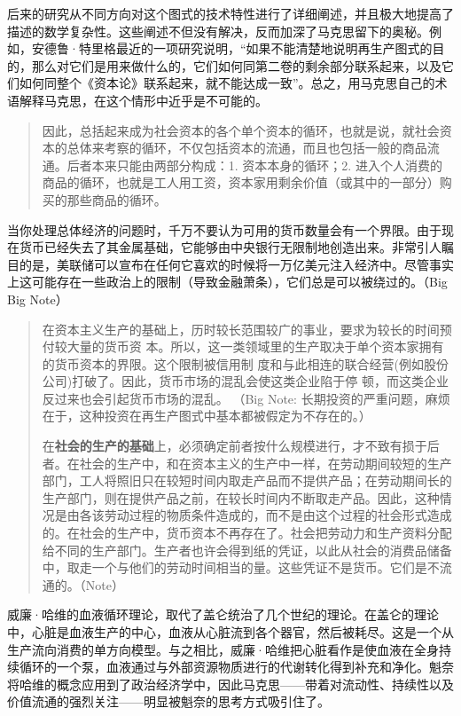 后来的研究从不同方向对这个图式的技术特性进行了详细阐述，并且极大地提高了描述的数学复杂性。这些阐述不但没有解决，反而加深了马克思留下的奥秘。例如，安德鲁·特里格最近的一项研究说明，“如果不能清楚地说明再生产图式的目的，那么对它们是用来做什么的，它们如何同第二卷的剩余部分联系起来，以及它们如何同整个《资本论》联系起来，就不能达成一致”。总之，用马克思自己的术语解释马克思，在这个情形中近乎是不可能的。

\begin{quotation}
因此，总括起来成为社会资本的各个单个资本的循环，也就是说，就社会资本的总体来考察的循环，不仅包括资本的流通，而且也包括一般的商品流通。后者本来只能由两部分构成：1. 资本本身的循环；2. 进入个人消费的商品的循环，也就是工人用工资，资本家用剩余价值（或其中的一部分）购买的那些商品的循环。 
\end{quotation}

当你处理总体经济的问题时，千万不要认为可用的货币数量会有一个界限。由于现在货币已经失去了其金属基础，它能够由中央银行无限制地创造出来。非常引人瞩目的是，美联储可以宣布在任何它喜欢的时候将一万亿美元注入经济中。尽管事实上这可能存在一些政治上的限制（导致金融萧条），它们总是可以被绕过的。（Big Big Note）

\begin{quotation}
在资本主义生产的基础上，历时较长范围较广的事业，要求为较长的时间预付较大量的货币资
本。所以，这一类领域里的生产取决于单个资本家拥有的货币资本的界限。这个限制被信用制
度和与此相连的联合经营(例如股份公司)打破了。因此，货币市场的混乱会使这类企业陷于停
顿，而这类企业反过来也会引起货币市场的混乱。 （Big
Note: 长期投资的严重问题，麻烦在于，这种投资在再生产图式中基本都被假定为不存在的。）

在\textbf{社会的生产的基础}上，必须确定前者按什么规模进行，才不致有损于后者。在社会的生产中，和在资本主义的生产中一样，在劳动期间较短的生产部门，工人将照旧只在较短时间内取走产品而不提供产品；在劳动期间长的生产部门，则在提供产品之前，在较长时间内不断取走产品。因此，这种情况是由各该劳动过程的物质条件造成的，而不是由这个过程的社会形式造成的。在社会的生产中，货币资本不再存在了。社会把劳动力和生产资料分配给不同的生产部门。生产者也许会得到纸的凭证，以此从社会的消费品储备中，取走一个与他们的劳动时间相当的量。这些凭证不是货币。它们是不流通的。（Note） 

\end{quotation}

威廉·哈维的血液循环理论，取代了盖仑统治了几个世纪的理论。在盖仑的理论中，心脏是血液生产的中心，血液从心脏流到各个器官，然后被耗尽。这是一个从生产流向消费的单方向模型。与之相比，威廉·哈维把心脏看作是使血液在全身持续循环的一个泵，血液通过与外部资源物质进行的代谢转化得到补充和净化。魁奈将哈维的概念应用到了政治经济学中，因此马克思——带着对流动性、持续性以及价值流通的强烈关注——明显被魁奈的思考方式吸引住了。

